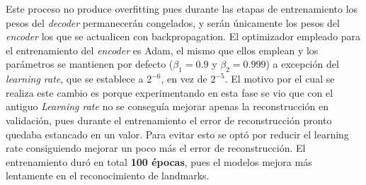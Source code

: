         \medskip

        \noindent Este proceso no produce overfitting pues durante las etapas de entrenamiento los pesos del \textit{decoder} permanecerán congelados, y serán únicamente los pesos del \textit{encoder} los que se actualicen con backpropagation. El optimizador empleado para el entrenamiento del \textit{encoder} es Adam, el mismo que ellos emplean y los parámetros se mantienen por defecto ($\beta_1=0.9$ y $\beta_2=0.999$) a excepción del \textit{learning rate}, que se establece a $2^{-6}$, en vez de $2^{-5}$. El motivo por el cual se realiza este cambio es porque experimentando en esta fase se vio que con el antiguo \textit{Learning rate} no se conseguía mejorar apenas la reconstrucción en validación, pues durante el entrenamiento el error de reconstrucción pronto quedaba estancado en un valor. Para evitar esto se optó por reducir el learning rate consiguiendo mejorar un poco más el error de reconstrucción. El entrenamiento duró en total \textbf{100 épocas}, pues el modelos mejora más lentamente en el reconocimiento de landmarks.

